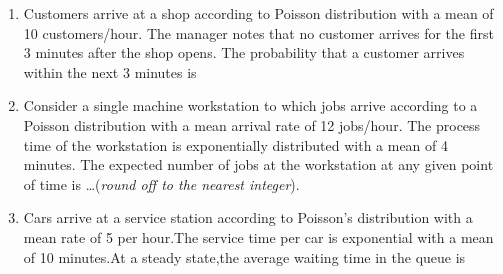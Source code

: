 \begin{enumerate}[label=\thesection.\arabic*.,ref=\thesection.\theenumi]
%
\item Customers arrive at a shop according to Poisson distribution with a mean of 10 customers/hour. The manager notes that no customer arrives for the first 3 minutes after the shop opens. The probability that a customer arrives within the next 3 minutes is

%
\solution


%
\item  Consider a single machine workstation to which jobs arrive according to a
Poisson distribution with a mean arrival rate of 12 jobs/hour. The process
time of the workstation is exponentially distributed with a mean of 4
minutes. The expected number of jobs at the workstation at any given
point of time is \ldots (\textit{round off to the nearest integer}).
%
\solution


%
\item Cars arrive at a service station according to Poisson's distribution with a mean rate of 5 per hour.The service time per car is exponential with a mean of 10 minutes.At a steady state,the average waiting time in the queue is 
%
\solution




\end{enumerate}